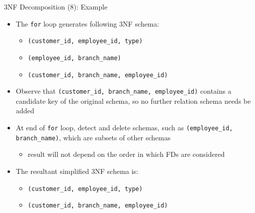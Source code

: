 \documentclass[aspectratio=169, xcolor=dvipsnames]{beamer}
\begin{document}
\begin{frame}{3NF Decomposition (8): Example}
    \begin{itemize}[<+->]
        \item The \texttt{for} loop generates following 3NF schema:
        \begin{itemize}
            \item[$\triangleright$] \texttt{(customer\_id, employee\_id, type)}
            \item[$\triangleright$] \texttt{(employee\_id, branch\_name)}
            \item[$\triangleright$] \texttt{(customer\_id, branch\_name, employee\_id)}
        \end{itemize}
        \item Observe that \texttt{(customer\_id, branch\_name, employee\_id)} contains a candidate key of the original schema, so no further relation schema needs be added
        \item At end of \texttt{for} loop, detect and delete schemas, such as \texttt{(employee\_id, branch\_name)}, which are subsets of other schemas
        \begin{itemize}
            \item[$\triangleright$] result will not depend on the order in which FDs are considered
        \end{itemize}
        \item The resultant simplified 3NF schema is:
        \begin{itemize}
            \item[$\triangleright$] \texttt{(customer\_id, employee\_id, type)}
            \item[$\triangleright$] \texttt{(customer\_id, branch\_name, employee\_id)}
        \end{itemize}
    \end{itemize}
\end{frame}
\end{document}
